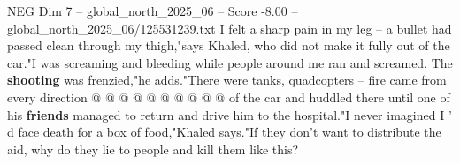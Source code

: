 \begin{textsample}{NEG Dim 7 – global\_north\_2025\_06 – Score -8.00 – global\_north\_2025\_06/125531239.txt}
I felt a sharp pain in my leg -- a bullet had passed clean through my thigh,"says Khaled, who did not make it fully out of the car."I was screaming and bleeding while people around me ran and screamed.
The \textbf{shooting} was frenzied,"he adds."There were tanks, quadcopters -- fire came from every direction @ @ @ @ @ @ @ @ @ @ of the car and huddled there until one of his \textbf{friends} managed to return and drive him to the hospital."I never imagined I ' d face death for a box of food,"Khaled says."If they don't want to distribute the aid, why do they lie to people and kill them like this?

\end{textsample}
